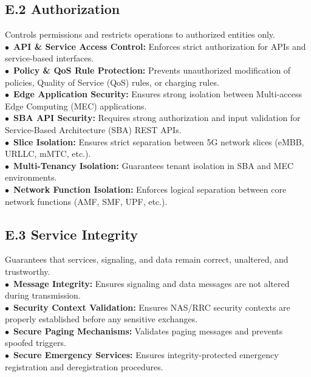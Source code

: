 \subsection*{E.2 Authorization}
Controls permissions and restricts operations to authorized entities only. \\
\noindent$\bullet$~\textbf{API \& Service Access Control:} Enforces strict authorization for APIs and service-based interfaces.  \\
\noindent$\bullet$~\textbf{Policy \& QoS Rule Protection:} Prevents unauthorized modification of policies, Quality of Service (QoS) rules, or charging rules.  \\
\noindent$\bullet$~\textbf{Edge Application Security:} Ensures strong isolation between Multi-access Edge Computing (MEC) applications.  \\
\noindent$\bullet$~\textbf{SBA API Security:} Requires strong authorization and input validation for Service-Based Architecture (SBA) REST APIs.  \\
\noindent$\bullet$~\textbf{Slice Isolation:} Ensures strict separation between 5G network slices (eMBB, URLLC, mMTC, etc.).  \\
\noindent$\bullet$~\textbf{Multi-Tenancy Isolation:} Guarantees tenant isolation in SBA and MEC environments.  \\
\noindent$\bullet$~\textbf{Network Function Isolation:} Enforces logical separation between core network functions (AMF, SMF, UPF, etc.).  \\


\subsection*{E.3 Service Integrity}
Guarantees that services, signaling, and data remain correct, unaltered, and trustworthy. \\
\noindent$\bullet$~\textbf{Message Integrity:} Ensures signaling and data messages are not altered during transmission.  \\
\noindent$\bullet$~\textbf{Security Context Validation:} Ensures NAS/RRC security contexts are properly established before any sensitive exchanges.  \\
\noindent$\bullet$~\textbf{Secure Paging Mechanisms:} Validates paging messages and prevents spoofed triggers.  \\
\noindent$\bullet$~\textbf{Secure Emergency Services:} Ensures integrity-protected emergency registration and deregistration procedures.  


